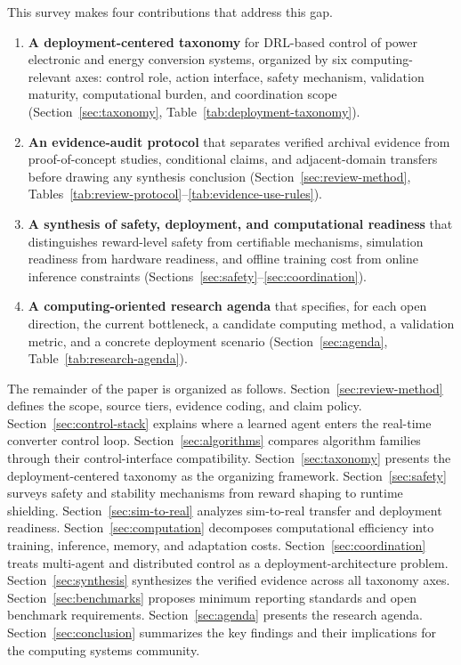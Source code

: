 \documentclass[manuscript,screen,review]{acmart}
\begin{document}
This survey makes four contributions that address this gap.
\begin{enumerate}
  \item \textbf{A deployment-centered taxonomy} for DRL-based control of power electronic and energy conversion systems, organized by six computing-relevant axes: control role, action interface, safety mechanism, validation maturity, computational burden, and coordination scope (Section~\ref{sec:taxonomy}, Table~\ref{tab:deployment-taxonomy}).
  \item \textbf{An evidence-audit protocol} that separates verified archival evidence from proof-of-concept studies, conditional claims, and adjacent-domain transfers before drawing any synthesis conclusion (Section~\ref{sec:review-method}, Tables~\ref{tab:review-protocol}--\ref{tab:evidence-use-rules}).
  \item \textbf{A synthesis of safety, deployment, and computational readiness} that distinguishes reward-level safety from certifiable mechanisms, simulation readiness from hardware readiness, and offline training cost from online inference constraints (Sections~\ref{sec:safety}--\ref{sec:coordination}).
  \item \textbf{A computing-oriented research agenda} that specifies, for each open direction, the current bottleneck, a candidate computing method, a validation metric, and a concrete deployment scenario (Section~\ref{sec:agenda}, Table~\ref{tab:research-agenda}).
\end{enumerate}

The remainder of the paper is organized as follows.
Section~\ref{sec:review-method} defines the scope, source tiers, evidence coding, and claim policy.
Section~\ref{sec:control-stack} explains where a learned agent enters the real-time converter control loop.
Section~\ref{sec:algorithms} compares algorithm families through their control-interface compatibility.
Section~\ref{sec:taxonomy} presents the deployment-centered taxonomy as the organizing framework.
Section~\ref{sec:safety} surveys safety and stability mechanisms from reward shaping to runtime shielding.
Section~\ref{sec:sim-to-real} analyzes sim-to-real transfer and deployment readiness.
Section~\ref{sec:computation} decomposes computational efficiency into training, inference, memory, and adaptation costs.
Section~\ref{sec:coordination} treats multi-agent and distributed control as a deployment-architecture problem.
Section~\ref{sec:synthesis} synthesizes the verified evidence across all taxonomy axes.
Section~\ref{sec:benchmarks} proposes minimum reporting standards and open benchmark requirements.
Section~\ref{sec:agenda} presents the research agenda.
Section~\ref{sec:conclusion} summarizes the key findings and their implications for the computing systems community.
\end{document}
